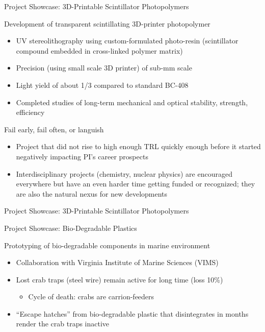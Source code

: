 \documentclass[xcolor={dvipsnames},professionalfonts]{beamer}
\begin{document}
\begin{frame}{Project Showcase: 3D-Printable Scintillator Photopolymers}
 \begin{block}{Development of transparent scintillating 3D-printer photopolymer}
  \begin{itemize}
   \item UV stereolithography using custom-formulated photo-resin (scintillator compound embedded in cross-linked polymer matrix)
   \item Precision (using small scale 3D printer) of sub-mm scale
   \item Light yield of about 1/3 compared to standard BC-408
   \item Completed studies of long-term mechanical and optical stability, strength, efficiency
  \end{itemize}
 \end{block}
 \begin{block}{Fail early, fail often, or languish}
  \begin{itemize}
   \item Project that did not rise to high enough TRL quickly enough before it started negatively impacting PI's career prospects
   \item Interdisciplinary projects (chemistry, nuclear physics) are encouraged everywhere but have an even harder time getting funded or recognized; they are also the natural nexus for new developments
  \end{itemize}
 \end{block}
\end{frame}

\begin{frame}{Project Showcase: 3D-Printable Scintillator Photopolymers}
 \begin{center}
 \end{center}
\end{frame}

\begin{frame}{Project Showcase: Bio-Degradable Plastics}
 \begin{block}{Prototyping of bio-degradable components in marine environment}
  \begin{itemize}
   \item Collaboration with Virginia Institute of Marine Sciences (VIMS)
   \item Lost crab traps (steel wire) remain active for long time (loss 10\%)
    \begin{itemize}
     \item Cycle of death: crabs are carrion-feeders
    \end{itemize}
   \item ``Escape hatches'' from bio-degradable plastic that disintegrates in months render the crab traps inactive
  \end{itemize}
 \begin{center}
 \end{center}
 \end{block}
\end{frame}
\end{document}
